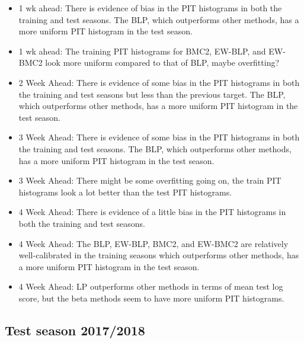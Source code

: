 \documentclass[
]{article}
\begin{document}
\begin{itemize}
\item 1 wk ahead: There is evidence of bias in the PIT histograms in both the training and test seasons. The BLP, which outperforms other methods, has a more uniform PIT histogram in the test season.
\item 1 wk ahead: The training PIT histograms for BMC2, EW-BLP, and EW-BMC2 look more uniform compared to that of BLP, maybe overfitting?
\item 2 Week Ahead: There is evidence of some bias in the PIT histograms in both the training and test seasons but less than the previous target. The BLP, which outperforms other methods, has a more uniform PIT histogram in the test season.
\item 3 Week Ahead: There is evidence of some bias in the PIT histograms in both the training and test seasons. The BLP, which outperforms other methods, has a more uniform PIT histogram in the test season.
\item 3 Week Ahead: There might be some overfitting going on, the train PIT histograms look a lot better than the test PIT histograms.
\item 4 Week Ahead: There is evidence of a little bias in the PIT histograms in both the training and test seasons. 
\item 4 Week Ahead: The BLP, EW-BLP, BMC2, and EW-BMC2 are relatively well-calibrated in the training seasons which outperforms other methods, has a more uniform PIT histogram in the test season.
\item 4 Week Ahead: LP outperforms other methods in terms of mean test log score, but the beta methods seem to have more uniform PIT histograms.
\end{itemize}

\newpage

\newpage

\hypertarget{test-season-20172018}{%
\subsection{Test season 2017/2018}\label{test-season-20172018}}
\end{document}
